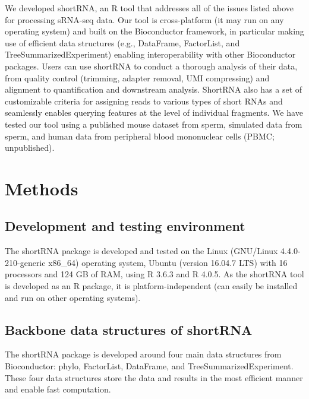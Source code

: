 \documentclass[12pt,twoside]{reedthesis}
\begin{document}
We developed shortRNA, an R tool that addresses all of the issues listed
above for processing sRNA-seq data. Our tool is cross-platform (it may
run on any operating system) and built on the Bioconductor framework, in
particular making use of efficient data structures (e.g., DataFrame,
FactorList, and TreeSummarizedExperiment) enabling interoperability with
other Bioconductor packages. Users can use shortRNA to conduct a
thorough analysis of their data, from quality control (trimming, adapter
removal, UMI compressing) and alignment to quantification and downstream
analysis. ShortRNA also has a set of customizable criteria for assigning
reads to various types of short RNAs and seamlessly enables querying
features at the level of individual fragments. We have tested our tool
using a published mouse dataset from sperm, simulated data from sperm,
and human data from peripheral blood mononuclear cells (PBMC;
unpublished).

\hypertarget{methods-2}{%
\section{Methods}\label{methods-2}}

\hypertarget{development-and-testing-environment}{%
\subsection{Development and testing environment}\label{development-and-testing-environment}}

The shortRNA package is developed and tested on the Linux (GNU/Linux
4.4.0-210-generic x86\_64) operating system, Ubuntu (version 16.04.7 LTS)
with 16 processors and 124 GB of RAM, using R 3.6.3 and R 4.0.5. As the
shortRNA tool is developed as an R package, it is platform-independent
(can easily be installed and run on other operating systems).

\hypertarget{backbone-data-structures-of-shortrna}{%
\subsection{Backbone data structures of shortRNA}\label{backbone-data-structures-of-shortrna}}

The shortRNA package is developed around four main data structures from
Bioconductor: phylo, FactorList, DataFrame, and
TreeSummarizedExperiment. These four data structures store the data and
results in the most efficient manner and enable fast computation.
\end{document}
